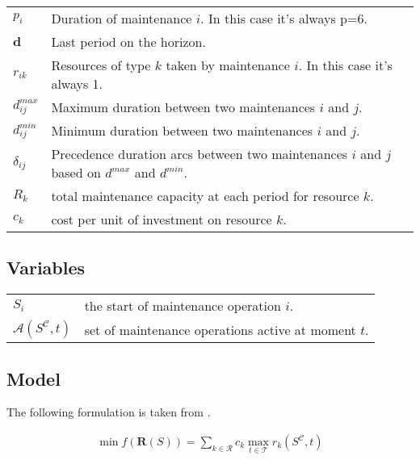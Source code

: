 \documentclass[a4paper,11pt]{article}
\begin{document}
    \begin{tabular}{ll}
        $p_i$ & Duration of maintenance $i$. In this case it's always p=6.\\
        $\mathbf{d}$ & Last period on the horizon.\\
        $r_{ik}$ & Resources of type $k$ taken by maintenance $i$. In this case it's always 1.\\
        $d^{max}_{ij}$ & Maximum duration between two maintenances $i$ and $j$.\\
        $d^{min}_{ij}$ & Minimum duration between two maintenances $i$ and $j$.\\
        ${\delta}_{ij}$ & Precedence duration arcs between two maintenances $i$ and $j$ based on $d^{max}$ and $d^{min}$.\\
        $R_k$ & total maintenance capacity at each period for resource $k$.\\
        $c_k$ & cost per unit of investment on resource $k$.
    \end{tabular}

    \subsection{Variables}

    \begin{tabular}{ll}
        $S_i$ & the start of maintenance operation $i$.\\
        $\mathcal{A}(S^{\mathcal{C}}, t)$ & set of maintenance operations active at moment $t$.\\
    \end{tabular}

    \subsection{Model}

    The following formulation is taken from \cite{Neumann2000}.

    \begin{align}
        \min f(\mathbf{R}(S)) = \sum_{k \in \mathcal{R}} c_k \max_{t \in \mathcal{T}} r_k(S^{\mathcal{C}}, t)
    \end{align}
\end{document}
